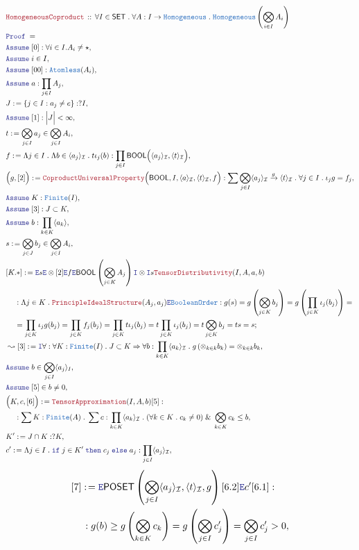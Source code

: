 \documentclass[12pt]{scrartcl}
\newcommand{\TYPE}[1]{\textcolor{NavyBlue}{\mathtt{#1}}}
\newcommand{\LOGIC}[1]{\textcolor{Blue}{\mathtt{#1}}}
\newcommand{\THM}[1]{\textcolor{Maroon}{\mathtt{#1}}}
\renewcommand{\.}{\; . \;}
\newcommand{\de}{: \kern 0.1pc =}
\newcommand{\If}{\LOGIC{if} \;}
\newcommand{\Then}{ \; \LOGIC{then} \;}
\newcommand{\Else}{\; \LOGIC{else} \;}
\newcommand{\Theorem}[2]{& \THM{#1} \, :: \, #2 \\ & \Proof = \\ }
\newcommand{\NewLine}{\\ & \kern 1pc}
\newcommand{\Page}[1]{ \begin{align*} #1 \end{align*}   }
\renewcommand{\And}{\; \& \;}
\newcommand{\Imply}{\Rightarrow}
\newcommand{\Intro}{\LOGIC{I}}
\newcommand{\Elim}{\LOGIC{E}}
\newcommand{\Arrow}{\xrightarrow}
\newcommand{\Say}[3]{& #1 \de #2 : #3, \\}
\newcommand{\SayIn}[3]{& #1 \de #2 \in #3, \\}
\newcommand{\Conclude}[3]{& #1 \de #2 : #3; \\}
\newcommand{\Derive}[3]{& \leadsto #1 \de #2 : #3, \\}
\newcommand{\Assume}[2]{& \LOGIC{Assume} \; #1 : #2, \\}
\newcommand{\AssumeIn}[2]{& \LOGIC{Assume} \; #1 \in #2, \\}
\newcommand{\Proof}{\LOGIC{Proof} \; }
\newcommand{\Finite}{\TYPE{Finite}}
\newcommand{\I}{\mathcal{I}}
\newcommand{\SET}{\mathsf{SET}}
\newcommand{\POSET}{\mathsf{POSET}}
\newcommand{\Aless}{\TYPE{Atomless}}
\newcommand{\Homog}{\TYPE{Homogeneous}}
\newcommand{\BOOL}{\mathsf{BOOL}}
\begin{document}
\Page{
	\Theorem{HomogeneousCoproduct}
	{
		\forall I \in \SET \.
		\forall A : I \to \Homog \.
		\Homog\left(\bigotimes_{i \in I} A_i \right)
	}
	\Assume{[0]}{\forall i \in I . A_i \neq \star}
	\AssumeIn{i}{I}
	\Assume{[00]}{\Aless(A_i)}
	\Assume{a}{\prod_{j \in I} A_j}
	\Say{J}{\{ j \in I : a_j \neq e \}}{?I}
	\Assume{[1]}{ \Big|J\Big| < \infty }
	\SayIn{t}{\bigotimes_{j \in I} a_j}{\bigotimes_{j \in I} A_i}
	\Say{f}{
		\Lambda j \in I \. 
		\Lambda b  \in \langle a_j\rangle_\I \.
		t\iota_j(b)
	}
	{
		\prod_{j \in I} \BOOL\Big( \langle a_j \rangle_\I, \langle t \rangle_\I \Big)
	}
	\Say{\Big(g,[2]\Big)}{
		\THM{CoproductUniversalProperty}\Big(
			\BOOL,
			I,
			\langle a \rangle_\I,
			\langle t \rangle_\I,
			f			 
		\Big)
	}
	{
		\sum \bigotimes_{j \in I} \langle a_j \rangle_\I
		\Arrow{g} \langle t \rangle_\I \. \forall j \in I \. \iota_j g = f_j 
	}
	\Assume{K}{\Finite(I)}
	\Assume{[3]}{ J \subset K}
	\Assume{b}{\prod_{k \in K} \langle a_k \rangle}
	\SayIn{s}{\bigotimes_{j \in J} b_j}{\bigotimes_{j \in I} A_i }
	\Conclude{[K.*]}{
		\Elim s
		\Elim \otimes
		[2]
		\Elim f
		\Elim \BOOL\left( \bigotimes_{j \in K} A_j \right)
		\Intro \otimes
		\Intro s
		\THM{TensorDistributivity}(I,A,a,b)
		\NewLine :
		\Lambda j \in K \.
		\THM{PrincipleIdealStructure}(A_j,a_j)
		\Elim \TYPE{BooleanOrder}	
	}
	{		
		g(s) =
		g\left(\bigotimes_{j \in K} b_j \right) =
		g\left(\prod_{j \in K} \iota_j(b_j) \right) = \NewLine =
		\prod_{j \in K} \iota_j g (b_j) = 
		\prod_{j \in K} f_j(b_j) = 
		\prod_{j \in K} t \iota_j(b_j) =
		t \prod_{j \in K} \iota_j(b_j) =
		t 	\bigotimes_{j \in K} b_j = 
		t s =
		s 
	}	
	\Derive{[3]}{\Intro \forall}
	{
		\forall K : \Finite(I) \.
		J \subset K \Imply
		\forall b : \prod_{k \in K} \langle a_k \rangle_\I \.
		g\left(\otimes_{k \in k} b_k \right) =  \otimes_{k \in k} b_k
	}
	\AssumeIn{b}{\bigotimes_{j \in I} \langle a_j \rangle_I}
	\AssumeIn{[5]}{b \neq 0}
	\Say{\Big(K,c,[6] \Big)}
	{
		\THM{TensorApproximation}(I,A,b)[5]
	}
	{
		\NewLine :		
		\sum K : \Finite(A) \.
		\sum c : \prod_{k \in K} \langle a_k \rangle_\I \.
		(\forall k \in K \. c_k \neq 0) \And
		\bigotimes_{k \in K} c_k \le b		
	}
	\Say{K'}{J\cap K}{?K}
	\Say{c'}{\Lambda j \in I \. \If j \in K' \Then c_j \Else a_j }
	{
		\prod_{j \in I} \langle a_j \rangle_\I
	}
}\Page{
	\Say{[7]}{
			\Elim \POSET\left( 
				\bigotimes_{j \in I} \langle a_j \rangle_\I, 
				\langle t \rangle_\I,
				g 
			\right)[6.2]\Elim c'
			[6.1]
	}
	{
		\NewLine:
		g(b) \ge	
		g\left( \bigotimes_{k \in K} c_k \right)  = 
		g\left( \bigotimes_{j \in I} c_j' \right) = 
		\bigotimes_{j \in I} c_j' > 0				
}}
\end{document}
